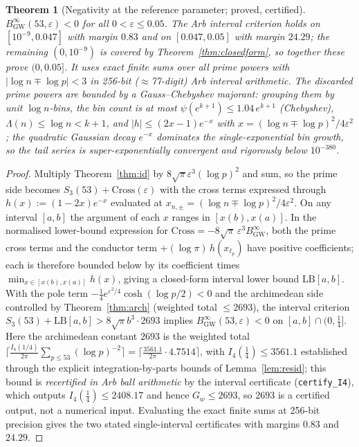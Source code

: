 \documentclass[11pt]{article}
\newtheorem{theorem}{Theorem}[section]
\newcommand{\BinfGW}{B_{\mathrm{GW}}^{\infty}}   %
\begin{document}
\begin{theorem}[Negativity at the reference parameter; proved, certified]
\label{thm:ref}
$\BinfGW(53,\varepsilon)<0$ for all $0<\varepsilon\le 0.05$.
The Arb interval criterion holds on $[10^{-9},0.047]$ with margin $0.83$ and on
$[0.047,0.05]$ with margin $24.29$; the remaining $(0,10^{-9})$ is covered by
Theorem~\ref{thm:closedform}, so together these prove $(0,0.05]$. It uses exact finite sums over all prime
powers with $|\log n\mp\log p|<3$ in 256-bit ($\approx$77-digit) Arb interval arithmetic. The
discarded prime powers are bounded by a Gauss--Chebyshev majorant: grouping
them by unit $\log n$-bins, the bin count is at most
$\psi(e^{k+1})\le1.04\,e^{k+1}$ (Chebyshev), $\Lambda(n)\le\log n<k+1$, and
$|h|\le(2x-1)e^{-x}$ with $x=(\log n\mp\log p)^2/4\varepsilon^2$; the quadratic
Gaussian decay $e^{-x}$ dominates the single-exponential bin growth, so the
tail series is super-exponentially convergent and rigorously below
$10^{-380}$.
\end{theorem}

\begin{proof}
Multiply Theorem~\ref{thm:id} by $8\sqrt\pi\varepsilon^3(\log p)^2$ and sum,
so the prime side becomes $S_3(53)+\mathrm{Cross}(\varepsilon)$ with the
cross terms expressed through $h(x):=(1-2x)e^{-x}$ evaluated at
$x_{n,\pm}=(\log n\mp\log p)^2/4\varepsilon^2$.
On any interval $[a,b]$ the argument of each $x$ ranges in $[x(b),x(a)]$.
In the normalised lower-bound expression for
$\mathrm{Cross}=-8\sqrt\pi\,\varepsilon^3\BinfGW$, both the prime cross terms and
the conductor term $+(\log\pi)\,h(x_{\ell_p})$ have positive coefficients; each
is therefore bounded below by its coefficient times
$\min_{x\in[x(b),x(a)]}h(x)$, giving a
closed-form interval lower bound
$\mathrm{LB}[a,b]$.
With the pole term $-\tfrac14 e^{\varepsilon^2/4}\cosh(\log p/2)<0$ and the
archimedean side controlled by Theorem~\ref{thm:arch} (weighted total
$\le 2693$), the interval criterion
$S_3(53)+\mathrm{LB}[a,b]>8\sqrt\pi b^3\cdot 2693$ implies
$\BinfGW(53,\varepsilon)<0$ on $[a,b]\cap(0,\tfrac14]$.
Here the archimedean constant $2693$ is the weighted total
$\bigl\lceil \tfrac{I_4(1/4)}{2\pi}\sum_{p\le53}(\log p)^{-2}\bigr\rceil
=\lceil \tfrac{3561.1}{2\pi}\cdot4.7514\rceil$, with $I_4(\tfrac14)\le3561.1$
established through the explicit integration-by-parts bounds of
Lemma~\ref{lem:resid}; this bound is \emph{recertified in Arb ball arithmetic}
by the interval certificate (\texttt{certify\_I4}), which outputs
$I_4(\tfrac14)\le2408.17$ and hence $G_w\le2693$, so $2693$ is a certified
output, not a numerical input.
Evaluating the exact finite sums at 256-bit precision gives the two stated
single-interval certificates with margins $0.83$ and $24.29$.
\end{proof}
\end{document}
